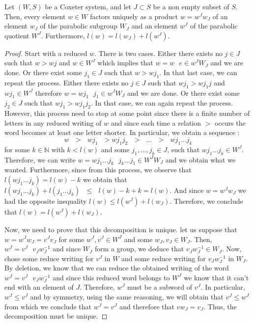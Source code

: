 \documentclass[envcountsame,envcountchap]{svmono}
\newcommand{\N}{\mathbb N}
\newcommand{\sub}{\subset}
\newcommand{\qq}{\text{ }}
\begin{document}
\begin{proposition}
	Let $(W,S)$ be a Coxeter system, and let $J\sub S$ be a non empty subset of $S$. Then, every element $w\in W$ factors uniquely as a product $w=w^Jw_J$ of an element $w_J$ of the parabolic subgroup $W_J$ and an element $w^J$ of the parabolic quotient $W^J$. Furthermore, $l(w)=l(w_J)+l(w^J)$.
\end{proposition}
\begin{proof}
	Start with a reduced $w$. There is two cases. Either there exists no $j\in J$ such that $w>wj$ and $w\in W^J$ which implies that $w=w\qq e\in w^JW_J$ and we are done. Or there exist some $j_1\in J$ such that $w>wj_1$. In that last case, we can repeat the process. Either there exists no $j\in J$ such that $wj_1>wj_1j$ and $wj_1\in W^J$ therefore $w=wj_1\qq j_1\in w^JW_J$ and we are done. Or there exist some $j_2\in J$ such that $wj_1>wj_1j_2$. In that case, we can again repeat the process. However, this process need to stop at some point since there is a finite number of letters in any reduced writing of $w$ and since each time a relation $>$ occurs the word becomes at least one letter shorter. In particular, we obtain a sequence :
	\begin{equation}
	w\qq >\qq wj_1\qq >wj_1j_2\qq >\qq ...\qq >\qq wj_1...j_k
	\end{equation}
	for some $k\in\N$ with $k<l(w)$ and some $j_1,...,j_k\in J$, such that $wj_1...j_k\in W^J$. Therefore, we can write $w=wj_1...j_k\qq j_k...j_1\in W^JW_J$ and we obtain what we wanted. Furthermore, since from this process, we observe that $l(wj_1...j_k)=l(w)-k$ we obtain that $l(wj_1...j_k)+l(j_1...j_k)\qq\leq \qq l(w)-k+k=l(w)$. And since $w=w^Jw_J$ we had the opposite inequality $l(w)\leq l(w^J)+l(w_J)$. Therefore, we conclude that $l(w)=l(w^J)+l(w_J)$.  
	
	Now, we need to prove that this decomposition is unique. let us suppose that $w=w^Jw_J=v^Jv_J$ for some $w^J,v^J\in W^J$ and some $w_J,v_J\in W_J$. Then, $w^J=v^J\qq v_Jw_{J}^{-1}$ and since $W_J$ form a group, we deduce that $v_Jw_{J}^{-1}\in W_J$. Now, chose some reduce writing for $v^J$ in $W$ and some reduce writing for $v_Jw_J^{-1}$ in $W_J$. By deletion, we know that we can reduce the obtained writing of the word $w^J=v^J\qq v_Jw_{J}^{-1}$ and since this reduced word belongs to $W^J$ we know that it can't end with an element of $J$. Therefore, $w^J$ must be a subword of $v^J$. In particular, $w^J\leq v^J$ and by symmetry, using the same reasoning, we will obtain that $v^J\leq w^J$ from which we conclude that $w^J=v^J$ and therefore that $vw_J=v_J$. Thus, the decomposition must be unique.
\end{proof}
\end{document}
